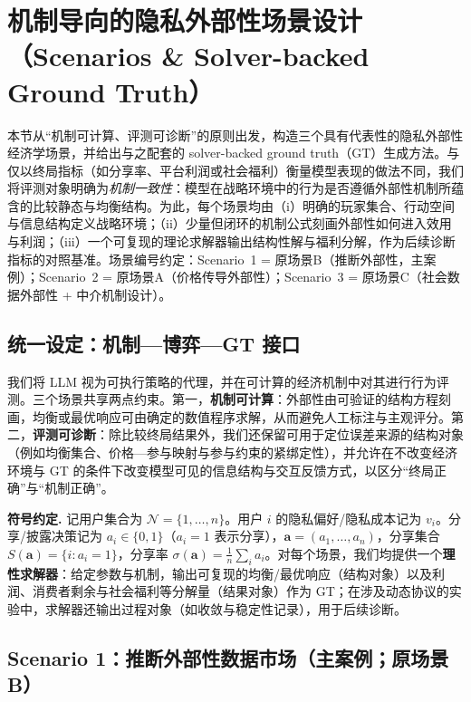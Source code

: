 \section{机制导向的隐私外部性场景设计（Scenarios \& Solver-backed Ground Truth）}
\label{sec:mechanism_scenarios_main}

本节从“机制可计算、评测可诊断”的原则出发，构造三个具有代表性的隐私外部性经济学场景，并给出与之配套的 solver-backed ground truth（GT）生成方法。与仅以终局指标（如分享率、平台利润或社会福利）衡量模型表现的做法不同，我们将评测对象明确为\emph{机制一致性}：模型在战略环境中的行为是否遵循外部性机制所蕴含的比较静态与均衡结构。为此，每个场景均由（i）明确的玩家集合、行动空间与信息结构定义战略环境；（ii）少量但闭环的机制公式刻画外部性如何进入效用与利润；（iii）一个可复现的理论求解器输出结构性解与福利分解，作为后续诊断指标的对照基准。场景编号约定：Scenario~1 = 原场景B（推断外部性，主案例）；Scenario~2 = 原场景A（价格传导外部性）；Scenario~3 = 原场景C（社会数据外部性 + 中介机制设计）。

\subsection{统一设定：机制—博弈—GT 接口}
\label{subsec:unified_interface}

我们将 LLM 视为可执行策略的代理，并在可计算的经济机制中对其进行行为评测。三个场景共享两点约束。第一，\textbf{机制可计算}：外部性由可验证的结构方程刻画，均衡或最优响应可由确定的数值程序求解，从而避免人工标注与主观评分。第二，\textbf{评测可诊断}：除比较终局结果外，我们还保留可用于定位误差来源的结构对象（例如均衡集合、价格—参与映射与参与约束的紧绑定性），并允许在不改变经济环境与 GT 的条件下改变模型可见的信息结构与交互反馈方式，以区分“终局正确”与“机制正确”。


\noindent\textbf{符号约定.}
记用户集合为 $\mathcal{N}=\{1,\dots,n\}$。用户 $i$ 的隐私偏好/隐私成本记为 $v_i$。分享/披露决策记为 $a_i\in\{0,1\}$（$a_i=1$ 表示分享），$\mathbf{a}=(a_1,\dots,a_n)$，分享集合 $S(\mathbf{a})=\{i:a_i=1\}$，分享率 $\sigma(\mathbf{a})=\frac{1}{n}\sum_i a_i$。对每个场景，我们均提供一个\textbf{理性求解器}：给定参数与机制，输出可复现的均衡/最优响应（结构对象）以及利润、消费者剩余与社会福利等分解量（结果对象）作为 GT；在涉及动态协议的实验中，求解器还输出过程对象（如收敛与稳定性记录），用于后续诊断。

\subsection{Scenario 1：推断外部性数据市场（主案例；原场景B）}
\label{subsec:scenarioB}

